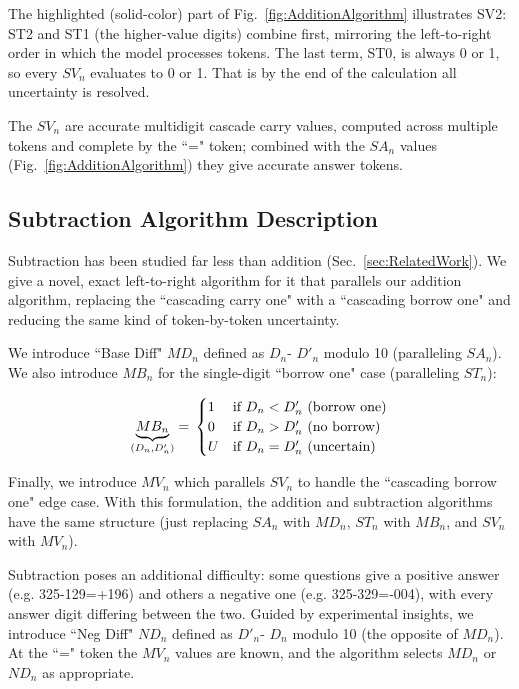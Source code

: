\documentclass[11pt]{article}
\newcommand{\SAN}{$SA_{n}$ }
\newcommand{\DN}{$D_{n}$}
\newcommand{\DND}{$D'_{n}$}
\begin{document}
The highlighted (solid-color) part of Fig.~\ref{fig:AdditionAlgorithm} illustrates SV2: ST2 and ST1 (the higher-value digits) combine first,
mirroring the left-to-right order in which the model processes tokens. The last term, ST0, is always 0 or 1, so every $SV_n$ evaluates
to 0 or 1. That is by the end of the calculation all uncertainty is resolved.

The $SV_n$ are accurate multidigit cascade carry values, computed across multiple tokens and complete by the “=" token; combined with
the \SAN values (Fig.~\ref{fig:AdditionAlgorithm}) they give accurate answer tokens.

\subsection{Subtraction Algorithm Description}
\label{Sec:SubtractionFramework}

Subtraction has been studied far less than addition (Sec.~\ref{sec:RelatedWork}). We give a novel, exact left-to-right algorithm for it that
parallels our addition algorithm, replacing the “cascading carry one" with a “cascading borrow one" and reducing the same kind of
token-by-token uncertainty.

We introduce “Base Diff" $MD_n$ defined as \DN - \DND $ $ modulo 10 (paralleling $SA_n$). We also introduce $MB_n$ for the single-digit “borrow one" case (paralleling $ST_n$):

\begin{equation}
    \underbrace{MB_n}_{(D_n, D'_n)} = \\
    \begin{cases}
        1 & \text{if } D_n < D'_n  \text{ (borrow one)}\\
        0 & \text{if } D_n > D'_n \text{ (no borrow)}\\
        U & \text{if } D_n = D'_n \text{ (uncertain)} \\
    \end{cases}
\end{equation}

Finally, we introduce $MV_n$ which parallels $SV_n$ to handle the “cascading borrow one" edge case. With this formulation, the addition and subtraction algorithms 
have the same structure (just replacing $SA_n$ with $MD_n$, $ST_n$ with $MB_n$, and $SV_n$ with $MV_n$). 

Subtraction poses an additional difficulty: some questions give a positive answer (e.g. 325-129=+196) and others a negative one
(e.g. 325-329=-004), with every answer digit differing between the two. Guided by experimental insights, we introduce “Neg Diff" $ND_n$
defined as \DND - \DN $ $ modulo 10 (the opposite of $MD_n$). At the “=" token the $MV_n$ values are known, and the algorithm
selects $MD_n$ or $ND_n$ as appropriate.
\end{document}
